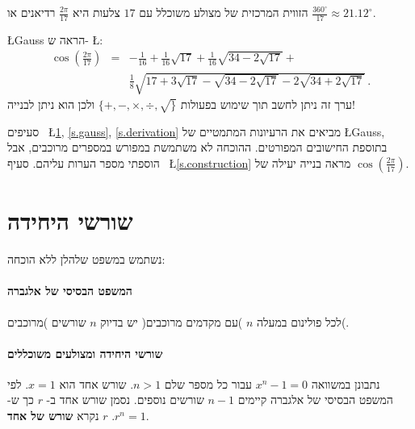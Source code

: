 \documentclass[11pt,a4paper]{article}
\newenvironment{form}[1]{%
\begin{displaymath}%
\renewcommand{\arraystretch}{#1}%
\begin{array}{lcl}}%
{\end{array}%
\end{displaymath}%
}
\newcommand*{\disfrac}[2]{\displaystyle\frac{#1}{#2}}
\newcommand*{\sm}[1]{$\scriptstyle #1$}
\begin{document}
הזווית המרכזית של מצולע משוכלל עם 
$17$
צלעות היא
$\disfrac{2\pi}{17}$
רדיאנים או
$\disfrac{360^\circ}{17}\approx 21.12^\circ$. 
\begin{center}
\end{center}
\L{Gauss}
הראה ש-%
\L{\cite{gauss,jorg}}:
\begin{form}{3}
\cos\left(\disfrac{2\pi}{17}\right) &=& 
-\disfrac{1}{16}+\disfrac{1}{16}\sqrt{17} + 
     \disfrac{1}{16}\sqrt{34-2\sqrt{17}}
    + \\
    &&
     \disfrac{1}{8}\sqrt{
     17+3\sqrt{17} - 
     \sqrt{34-2\sqrt{17}}
   -2
     \sqrt{34+2\sqrt{17}}
   }\,.
\end{form}
ערך זה ניתן לחשב תוך שימוש בפעולות
$\{+,-,\times,\div,\surd\}$
ולכן הוא ניתן לבנייה!

סעיפים~%
\L{\ref{s.roots}, \ref{s.gauss}, \ref{s.derivation}}
מביאים את הרעיונות המתמטיים של
\L{Gauss},
בתוספת החישובים המפורטים.
ההוכחה לא משתמשת במפורש במספרים מרוכבים, אבל הוספתי מספר הערות עליהם.
סעיף~%
\L{\ref{s.construction}}
מראה בנייה יעילה של
$\cos\left(\disfrac{2\pi}{17}\right)$.

\newpage

\section{שורשי היחידה}\label{s.roots}

נשתמש במשפט שלהלן ללא הוכחה:
\paragraph{המשפט הבסיסי של אלגברה}
לכל פולינום במעלה 
$n$
)עם מקדמים מרוכבים(
יש בדיוק
$n$
שורשים
)מרוכבים(.

\paragraph{%
שורשי היחידה ומצולעים משוכללים%
}
נתבונן במשוואה
$x^{n}-1=0$
עבור כל מספר שלם
$n>	 1$.
שורש אחד הוא
$x=1$.
לפי המשפט הבסיסי של אלגברה קיימים
$n-1$
שורשים נוספים. נסמן שורש אחד ב-%
$r$
כך ש-%
$r^{n}=1$.
$r$
נקרא
\textbf{שורש של אחד}.
\end{document}
